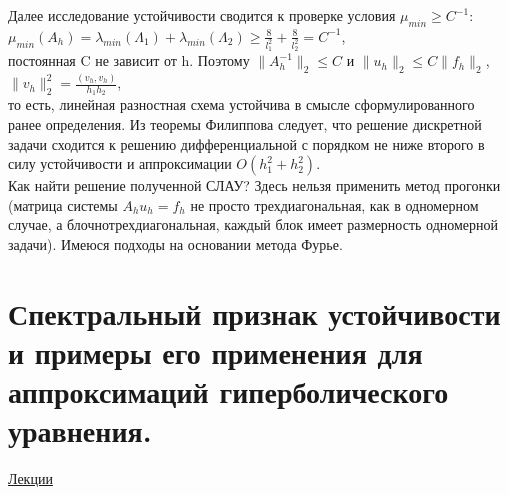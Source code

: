 \documentclass[specialist, subf, href, colorlinks=true, 12pt, times, mtpro, final]{disser}
\theoremstyle{definition}
\begin{document}
{    Далее исследование устойчивости сводится к проверке условия $\mu_{min} \geqslant C^{-1}$:\\
    $\mu_{min}(A_h) = \lambda_{min}(\Lambda_1) + \lambda_{min}(\Lambda_2) \geqslant \frac{8}{l^2_1} + \frac{8}{l^2_2} = C^{-1}$,\\
    постоянная C не зависит от h. Поэтому $\|A_h^{-1}\|_2 \leqslant C$ и $\|u_h\|_2 \leqslant C\|f_h\|_2$, $\|v_h\|^2_2 = \frac{(v_h,v_h)}{h_1h_2}$,\\
    то есть, линейная разностная схема устойчива в смысле сформулированного ранее определения. Из теоремы Филиппова следует, что решение дискретной задачи сходится к решению дифференциальной с порядком не ниже второго в силу устойчивости и аппроксимации $O(h_1^2 + h_2^2)$.\\
    Как найти решение полученной СЛАУ? Здесь нельзя применить метод прогонки (матрица системы $A_hu_h = f_h$ не просто трехдиагональная, как в одномерном случае, а блочнотрехдиагональная, каждый блок имеет размерность одномерной задачи). Имеюся подходы на основании метода Фурье. 	
    

\section {Спектральный признак устойчивости и примеры его применения для аппроксимаций гиперболического уравнения.}
    \hyperlink {lects.130}{Лекции}\\
    
}
\end{document}
